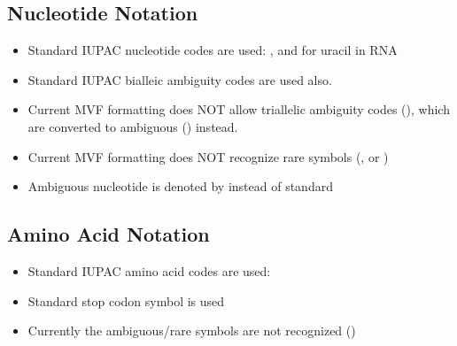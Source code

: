 \documentclass[letterpaper,11pt,english]{sphinxmanual}
\begin{document}
\subsection{Nucleotide Notation}
\label{\detokenize{mvf_spec:nucleotide-notation}}\begin{itemize}
\item {} 
Standard IUPAC nucleotide codes are used: , and  for uracil in RNA

\item {} 
Standard IUPAC bialleic ambiguity codes  are used also.

\item {} 
Current MVF formatting does NOT allow triallelic ambiguity codes (), which are converted to ambiguous () instead.

\item {} 
Current MVF formatting does NOT recognize rare symbols (, or )

\item {} 
Ambiguous nucleotide is denoted by  instead of standard 

\end{itemize}


\subsection{Amino Acid Notation}
\label{\detokenize{mvf_spec:amino-acid-notation}}\begin{itemize}
\item {} 
Standard IUPAC amino acid codes are used: 

\item {} 
Standard stop codon symbol \sphinxcode{*} is used

\item {} 
Currently the ambiguous/rare symbols are not recognized ()

\end{itemize}
\end{document}
